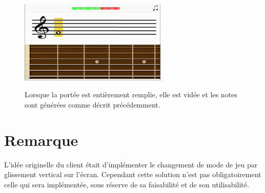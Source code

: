 \documentclass{scrreprt}
\begin{document}
\bigbreak

\begin{figure}[!ht]
  \begin{minipage}{0.55\linewidth}
    \includegraphics[width=7cm]{images/maquette_usecase/portee/question_une_note_1.png}
  \end{minipage}\hfill
 \begin{minipage}{0.5\linewidth}
  {Lorsque la portée est entièrement remplie, elle est vidée et les notes sont générées comme décrit précédemment.}
   \end{minipage}
\end{figure}

\bigbreak




\section{Remarque}

L'idée originelle du client était d'implémenter le changement de mode de jeu par glissement vertical sur l'écran. 
Cependant cette solution n'est pas obligatoirement celle qui sera implémentée, sous réserve de sa faisabilité et de son utilisabilité.
\end{document}
